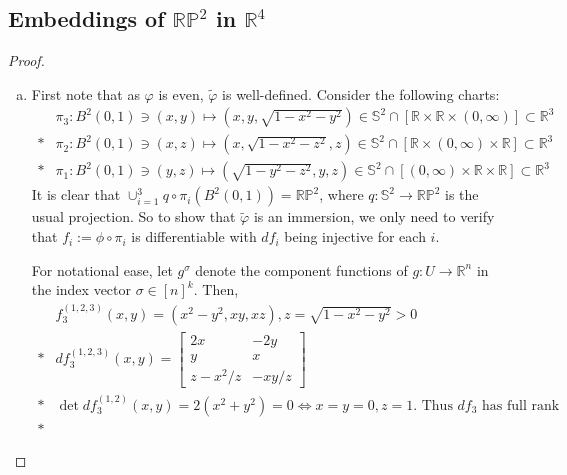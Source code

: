 
{

\newcommand*{\SP}{\mathbb{S}^2} %
\newcommand*{\RP}{\mathbb{RP}^2} %



\subsection{Embeddings of $\RP$ in $\mathbb{R}^4$}


\begin{proof}
\begin{enumerate}[(a)]
	\item
	First note that as $\varphi$ is even, $\tilde{\varphi}$ is well-defined. Consider the following charts:
	\begin{align*}
		& \pi_3: B^2(0,1) \ni (x,y) \mapsto (x,y,\sqrt{1-x^2-y^2})
		\in \SP \cap \left[\mathbb{R} \times \mathbb{R} \times (0,\infty)\right]
		\subset \mathbb{R}^3 \\*
		& \pi_2: B^2(0,1) \ni (x,z) \mapsto (x,\sqrt{1-x^2-z^2},z)
		\in \SP \cap \left[\mathbb{R} \times (0,\infty) \times \mathbb{R}\right]
		\subset \mathbb{R}^3 \\*
		& \pi_1: B^2(0,1) \ni (y,z) \mapsto (\sqrt{1-y^2-z^2},y,z)
		\in \SP \cap \left[(0,\infty) \times \mathbb{R} \times \mathbb{R}\right]
		\subset \mathbb{R}^3
	\end{align*}
	It is clear that ${\cup_{i=1}^3 q \circ \pi_i (B^2(0,1)) = \RP}$, where ${q:\SP \rightarrow \RP}$ is the usual projection. So to show that $\tilde{\varphi}$ is an immersion, we only need to verify that ${f_i:=\phi \circ \pi_i}$ is differentiable with $d f_i$ being injective for each $i$.
	\par
	For notational ease, let $g^\sigma$ denote the component functions of ${g:U \rightarrow \mathbb{R}^n}$ in the index vector $\sigma \in [n]^k$. Then,
	\begin{align*}
		& f_3^{(1,2,3)}(x,y)=(x^2-y^2,xy,xz), z=\sqrt{1-x^2-y^2}>0 \\*
		& d f_3^{(1,2,3)}(x,y)=
		\begin{bmatrix} 2x & -2y \\ y & x \\ z-x^2/z & -xy/z \end{bmatrix} \\*
		& \det d f_3^{(1,2)}(x,y) = 2(x^2+y^2) = 0 \iff x=y=0,z=1. \textrm{ Thus } d f_3 \textrm{ has full rank} \\*

\end{align*}
\end{enumerate}
\end{proof}}
